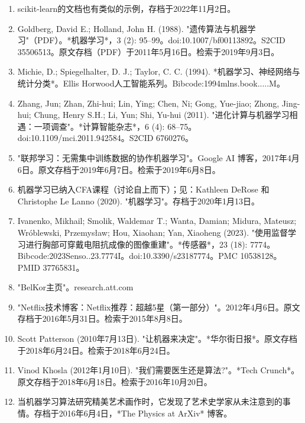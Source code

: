 \begin{enumerate}
\item scikit-learn的文档也有类似的示例，存档于2022年11月2日。
\item Goldberg, David E.; Holland, John H. (1988). "遗传算法与机器学习"（PDF）。*机器学习*，3 (2): 95–99。doi:10.1007/bf00113892。S2CID 35506513。原文存档（PDF）于2011年5月16日。检索于2019年9月3日。
\item Michie, D.; Spiegelhalter, D. J.; Taylor, C. C. (1994). *机器学习、神经网络与统计分类*。Ellis Horwood人工智能系列。Bibcode:1994mlns.book.....M。
\item Zhang, Jun; Zhan, Zhi-hui; Lin, Ying; Chen, Ni; Gong, Yue-jiao; Zhong, Jing-hui; Chung, Henry S.H.; Li, Yun; Shi, Yu-hui (2011). "进化计算与机器学习相遇：一项调查"。*计算智能杂志*，6 (4): 68–75。doi:10.1109/mci.2011.942584。S2CID 6760276。
\item "联邦学习：无需集中训练数据的协作机器学习"。Google AI 博客，2017年4月6日。原文存档于2019年6月7日。检索于2019年6月8日。
\item 机器学习已纳入CFA课程（讨论自上而下）；见：Kathleen DeRose 和 Christophe Le Lanno (2020). "机器学习"。存档于2020年1月13日。
\item Ivanenko, Mikhail; Smolik, Waldemar T.; Wanta, Damian; Midura, Mateusz; Wróblewski, Przemysław; Hou, Xiaohan; Yan, Xiaoheng (2023). "使用监督学习进行胸部可穿戴电阻抗成像的图像重建"。*传感器*，23 (18): 7774。Bibcode:2023Senso..23.7774I。doi:10.3390/s23187774。PMC 10538128。PMID 37765831。
\item "BelKor主页"。research.att.com
\item "Netflix技术博客：Netflix推荐：超越5星（第一部分）"。2012年4月6日。原文存档于2016年5月31日。检索于2015年8月8日。
\item Scott Patterson (2010年7月13日). "让机器来决定"。*华尔街日报*。原文存档于2018年6月24日。检索于2018年6月24日。
\item Vinod Khosla (2012年1月10日). "我们需要医生还是算法?"。*Tech Crunch*。原文存档于2018年6月18日。检索于2016年10月20日。
\item 当机器学习算法研究精美艺术画作时，它发现了艺术史学家从未注意到的事情。存档于2016年6月4日，*The Physics at ArXiv* 博客。
\end{enumerate}